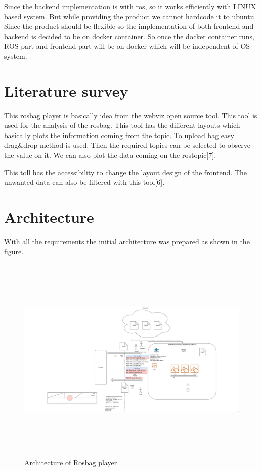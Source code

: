 Since the backend implementation is with ros, so it works efficiently with LINUX based system. But while providing the product we cannot hardcode it to ubuntu. Since the product should be flexible so the implementation of both frontend and backend is decided to be on docker container. So once the docker container runs, ROS part and frontend part will be on docker which will be independent of OS system. 

\section{Literature survey}

This rosbag player is basically idea from the webviz open source tool. This tool is used for the analysis of the rosbag. This tool has the different layouts which basically plots the information coming from the topic. To upload bag easy drag&drop method is used. Then the required topics can be selected to observe the value on it. We can also plot the data coming on the rostopic[7]. 

This toll has the accessibility to change the layout design of the frontend. The unwanted data can also be filtered with this tool[6].
\section{Architecture}
With all the requirements the initial architecture was prepared as shown in the figure. 
\begin{figure}[h]
	\begin{center}
		\includegraphics[height=10cm,width=\linewidth]{images/architecture.jpg}
		\caption{Architecture of Rosbag player}
	\end{center}
\end{figure}
\pagebreak
